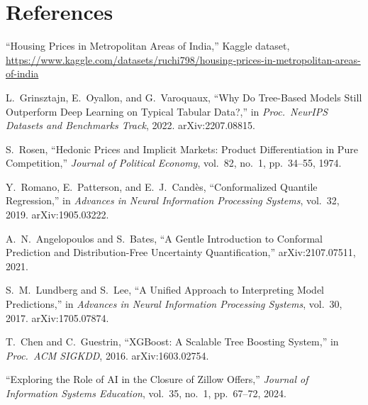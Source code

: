 \documentclass[12pt]{report}
\begin{document}
\chapter*{References}
\begin{enumerate}[label={[\arabic*]}, leftmargin=2.2em]

\item ``Housing Prices in Metropolitan Areas of India,'' Kaggle dataset,
\url{https://www.kaggle.com/datasets/ruchi798/housing-prices-in-metropolitan-areas-of-india}

\item L.\ Grinsztajn, E.\ Oyallon, and G.\ Varoquaux, ``Why Do Tree-Based Models Still
Outperform Deep Learning on Typical Tabular Data?,'' in \emph{Proc.\ NeurIPS Datasets
and Benchmarks Track}, 2022. arXiv:2207.08815.

\item S.\ Rosen, ``Hedonic Prices and Implicit Markets: Product Differentiation in
Pure Competition,'' \emph{Journal of Political Economy}, vol.\ 82, no.\ 1, pp.\
34--55, 1974.

\item Y.\ Romano, E.\ Patterson, and E.\ J.\ Cand\`es, ``Conformalized Quantile
Regression,'' in \emph{Advances in Neural Information Processing Systems}, vol.\ 32,
2019. arXiv:1905.03222.

\item A.\ N.\ Angelopoulos and S.\ Bates, ``A Gentle Introduction to Conformal
Prediction and Distribution-Free Uncertainty Quantification,'' arXiv:2107.07511,
2021.

\item S.\ M.\ Lundberg and S.\ Lee, ``A Unified Approach to Interpreting Model
Predictions,'' in \emph{Advances in Neural Information Processing Systems}, vol.\ 30,
2017. arXiv:1705.07874.

\item T.\ Chen and C.\ Guestrin, ``XGBoost: A Scalable Tree Boosting System,'' in
\emph{Proc.\ ACM SIGKDD}, 2016. arXiv:1603.02754.

\item ``Exploring the Role of AI in the Closure of Zillow Offers,'' \emph{Journal of
Information Systems Education}, vol.\ 35, no.\ 1, pp.\ 67--72, 2024.

\end{enumerate}

\appendix
\end{document}
